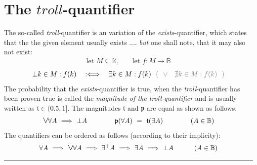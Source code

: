 \documentclass[pdftex,12pt,a4paper]{report}
\newcommand{\fpa}{\hbox{\fontsize{13.3pt}{15pt}\selectfont $ \vee $} \hspace{-1.2pt} \forall}
\begin{document}
    \section{The $ \textit{troll} $-quantifier}
    The so-called \emph{troll}-quantifier is an variation of the \emph{exists}-quantifier, which states that the the given element usually exists .... \emph{but} one shall note, that it may also not exist:
    \begin{equation*}
        \begin{aligned}
            \text{let } M \subseteq \mathbb{K} \text{,} \qquad \text{let } f : M \rightarrow \mathbb{B}
        \end{aligned}
    \end{equation*}
    \begin{equation*}
        \begin{aligned}
            \bot k \in M : f(k) \quad :\Longleftrightarrow \quad \exists k \in M : f(k) \textcolor{gray}{\ \ ( \ \ \vee \ \ \ \nexists k \in M : f(k) \ \ )}
        \end{aligned}
    \end{equation*}
    The probability that the \emph{exists}-quantifier is true, when the \emph{troll}-quantifier has been proven true is called the \textit{magnitude of the troll-quantifier} and is usually written as $ \mathfrak{t} \in (0.5,1] $. The magnitudes $ \mathfrak{t} $ and  $ \mathfrak{p} $ are equal as shown as follows:
    \begin{equation*}
        \begin{aligned}
            \fpa A \ \Longrightarrow \ \bot A
            \qquad\qquad
            \mathfrak{p}(\forall A) \ =\ \mathfrak{t}(\exists A)
            \qquad\qquad
            (A \in \mathbb{B})
        \end{aligned}
    \end{equation*}
    The quantifiers can be ordered as follows (according to their implicity):
    \begin{equation*}
        \begin{aligned}
            \forall A \ \Longrightarrow \ \fpa A \ \Longrightarrow \ \exists^+ A \ \Longrightarrow \ \exists A \ \Longrightarrow \ \bot A
            \qquad\quad
            (A \in \mathbb{B})
        \end{aligned}
    \end{equation*}
    \vspace{5mm} \hrule
\end{document}
